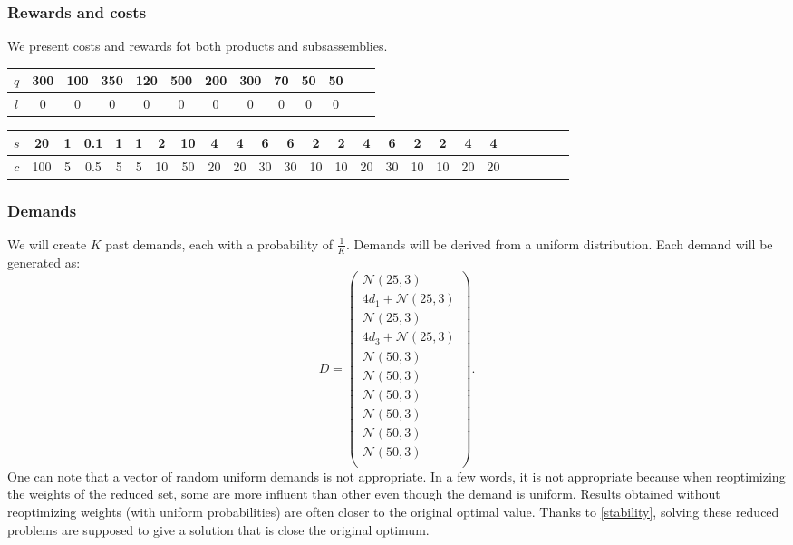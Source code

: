 \documentclass{amsart}
\begin{document}
\subsubsection{Rewards and costs}

We present costs and rewards fot both products and subsassemblies.


\begin{table}[!h]
    \centering
\begin{tabular}{|c|c|c|c|c|c|c|c|c|c|c|c|c|}
\hline
    $q$  &  300 & 100 & 350 & 120 & 500 & 200 & 300 & 70 & 50 & 50 \\
    \hline
    $l$  & 0 &0&0&0&0&0&0&0&0&0 \\
    \hline
\end{tabular}
\end{table}



\begin{table}[!h]
    \centering
\begin{tabular}{|c|c|c|c|c|c|c|c|c|c|c|c|c|c|c|c|c|c|c|c|c|c|c|c|c|}
\hline
    $s$  &  20 & 1 & 0.1 & 1 & 1 & 2 & 10 & 4 & 4 & 6 &6&2&2&4&6&2&2&4&4\\
    \hline
    $c$  & 100 & 5 &0.5& 5 & 5& 10& 50 & 20 & 20 & 30 & 30 &10& 10 & 20&30&10&10&20&20 \\
    \hline
\end{tabular}
\end{table}
\subsubsection{Demands}
We will create $K$ past demands, each with a probability of $\frac{1}{K}$. Demands will be derived from a uniform distribution. Each demand will be generated as:
$$
D = \begin{pmatrix} \mathcal{N}\left(25,3\right) \\ 4d_1 + \mathcal{N}\left(25,3\right)
  \\ \mathcal{N}\left(25,3\right) \\ 4d_3 + \mathcal{N}\left(25,3\right)
  \\ \mathcal{N}\left(50,3\right) \\ \mathcal{N}\left(50,3\right) \\ \mathcal{N}\left(50,3\right) \\ \mathcal{N}\left(50,3\right) \\ \mathcal{N}\left(50,3\right) \\ \mathcal{N}\left(50,3\right) \\ \end{pmatrix}.
$$
One can note that a vector of random uniform demands is not appropriate. In a few words, it is not appropriate because when reoptimizing the weights of the reduced set, some are more influent than other even though the demand is uniform. Results obtained without reoptimizing weights (with uniform probabilities) are often closer to the original optimal value. Thanks to \ref{stability}, solving these reduced problems are supposed to give a solution that is close the original optimum.
\end{document}
